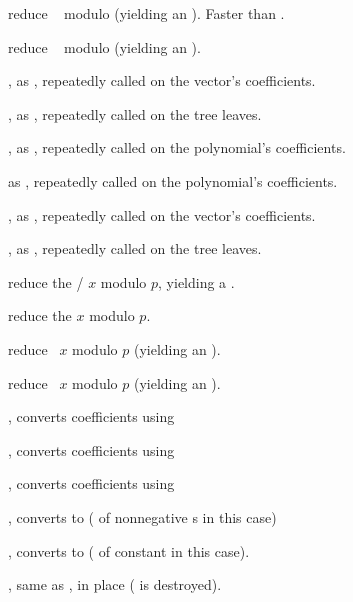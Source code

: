  reduce ~ modulo 
(yielding an ). Faster than .

 reduce ~ modulo 
(yielding an ).

, as , repeatedly
called on the vector's coefficients.

, as , repeatedly
called on the tree leaves.

, as ,
repeatedly called on the polynomial's coefficients.

 as ,
repeatedly called on the polynomial's coefficients.

, as ,
repeatedly called on the vector's coefficients.

, as ,
repeatedly called on the tree leaves.

 reduce the /
$x$ modulo $p$, yielding a .

 reduce the  $x$ modulo $p$.

 reduce ~$x$ modulo $p$
(yielding an ).

 reduce ~$x$ modulo $p$
(yielding an ).

, converts coefficients using 

, converts coefficients using 

, converts coefficients using 


, converts to  ( of nonnegative
s in this case)

, converts to  ( of constant
 in this case).

, same as , in place
( is destroyed).

